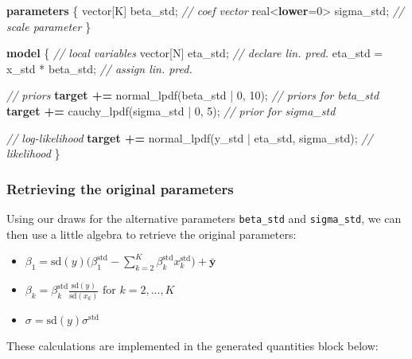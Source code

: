\documentclass[
  11pt,
]{article}
\newenvironment{Shaded}{\begin{snugshade}}{\end{snugshade}}
\newcommand{\CommentTok}[1]{\textcolor[rgb]{0.56,0.35,0.01}{\textit{#1}}}
\newcommand{\DataTypeTok}[1]{\textcolor[rgb]{0.13,0.29,0.53}{#1}}
\newcommand{\DecValTok}[1]{\textcolor[rgb]{0.00,0.00,0.81}{#1}}
\newcommand{\KeywordTok}[1]{\textcolor[rgb]{0.13,0.29,0.53}{\textbf{#1}}}
\newcommand{\NormalTok}[1]{#1}
\providecommand{\tightlist}{%
  \setlength{\itemsep}{0pt}\setlength{\parskip}{0pt}}
\begin{document}
\begin{Shaded}
\begin{Highlighting}[]
\KeywordTok{parameters}\NormalTok{ \{}
  \DataTypeTok{vector}\NormalTok{[K] beta\_std;      }\CommentTok{// coef vector}
  \DataTypeTok{real}\NormalTok{\textless{}}\KeywordTok{lower}\NormalTok{=}\DecValTok{0}\NormalTok{\textgreater{} sigma\_std; }\CommentTok{// scale parameter}
\NormalTok{\}}

\KeywordTok{model}\NormalTok{ \{}
  \CommentTok{// local variables}
  \DataTypeTok{vector}\NormalTok{[N] eta\_std;          }\CommentTok{// declare lin. pred.}
\NormalTok{  eta\_std = x\_std * beta\_std; }\CommentTok{// assign lin. pred.}

  \CommentTok{// priors}
  \KeywordTok{target +=}\NormalTok{ normal\_lpdf(beta\_std | }\DecValTok{0}\NormalTok{, }\DecValTok{10}\NormalTok{);  }\CommentTok{// priors for beta\_std}
  \KeywordTok{target +=}\NormalTok{ cauchy\_lpdf(sigma\_std | }\DecValTok{0}\NormalTok{, }\DecValTok{5}\NormalTok{);  }\CommentTok{// prior for sigma\_std}
  
  \CommentTok{// log{-}likelihood}
  \KeywordTok{target +=}\NormalTok{ normal\_lpdf(y\_std | eta\_std, sigma\_std); }\CommentTok{// likelihood}
\NormalTok{\}}
\end{Highlighting}
\end{Shaded}

\hypertarget{retrieving-the-original-parameters}{%
\subsubsection{Retrieving the original parameters}\label{retrieving-the-original-parameters}}

Using our draws for the alternative parameters \texttt{beta\_std} and \texttt{sigma\_std}, we can then use a little algebra to retrieve the original parameters:

\begin{itemize}
\tightlist
\item
  \(\beta_1 = \text{sd}(y) \Big(\beta_1^{\text{std}} - \sum_{k=2}^{K} \beta_k^{\text{std}} x_k^{\text{std}}\Big) + \bar{\mathbf{y}}\)
\item
  \(\beta_k = \beta_k^{\text{std}} \frac{\text{sd}(y)}{\text{sd}(x_k)} \text{ for } k = 2,...,K\)
\item
  \(\sigma = \text{sd}(y) \sigma^{\text{std}}\)
\end{itemize}

These calculations are implemented in the generated quantities block below:
\end{document}
